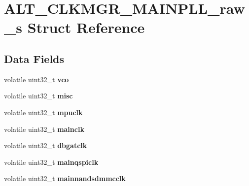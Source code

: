 \hypertarget{structALT__CLKMGR__MAINPLL__raw__s}{}\section{A\+L\+T\+\_\+\+C\+L\+K\+M\+G\+R\+\_\+\+M\+A\+I\+N\+P\+L\+L\+\_\+raw\+\_\+s Struct Reference}
\label{structALT__CLKMGR__MAINPLL__raw__s}
\subsection*{Data Fields}
\begin{DoxyCompactItemize}
\item 
\mbox{\label{structALT__CLKMGR__MAINPLL__raw__s_a41533e9366096234fb5c0a9cb2b95f8e}} 
volatile uint32\+\_\+t {\bfseries vco}
\item 
\mbox{\label{structALT__CLKMGR__MAINPLL__raw__s_a1703206733ca7b52e0cf476ea883ea53}} 
volatile uint32\+\_\+t {\bfseries misc}
\item 
\mbox{\label{structALT__CLKMGR__MAINPLL__raw__s_a7ef249bad2a2668e829a966a8d91724f}} 
volatile uint32\+\_\+t {\bfseries mpuclk}
\item 
\mbox{\label{structALT__CLKMGR__MAINPLL__raw__s_a53939fe44a3fadda12bfc6cf55a0164f}} 
volatile uint32\+\_\+t {\bfseries mainclk}
\item 
\mbox{\label{structALT__CLKMGR__MAINPLL__raw__s_ad4e3e15676da1ab9385215836b4998b3}} 
volatile uint32\+\_\+t {\bfseries dbgatclk}
\item 
\mbox{\label{structALT__CLKMGR__MAINPLL__raw__s_aecc1367291d2d8cbac502c9ff833d530}} 
volatile uint32\+\_\+t {\bfseries mainqspiclk}
\item 
\mbox{\label{structALT__CLKMGR__MAINPLL__raw__s_aaa0309bff66927f5fd9d097c1da9863a}} 
volatile uint32\+\_\+t {\bfseries mainnandsdmmcclk}
\item 
\mbox{\label{structALT__CLKMGR__MAINPLL__raw__s_a22a4fed24c736653daa8f5136e81eb4b}} 

\end{DoxyCompactItemize}
